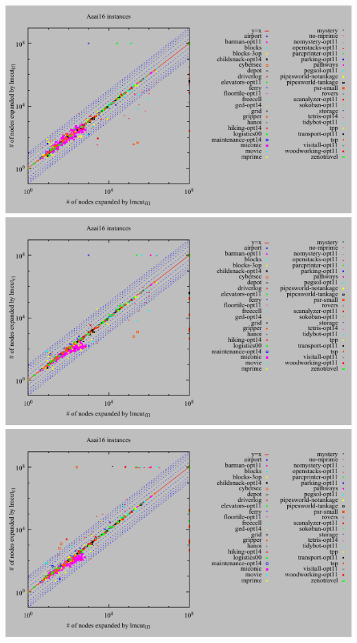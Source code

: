 \includegraphics{tables/aaai16-expanded-lmcut_ff-lmcut_lf.pdf}
\linebreak
\includegraphics{tables/aaai16-expanded-lmcut_ff-lmcut_r.pdf}
\linebreak
\includegraphics{tables/aaai16-expanded-lmcut_lf-lmcut_r.pdf}
\linebreak
